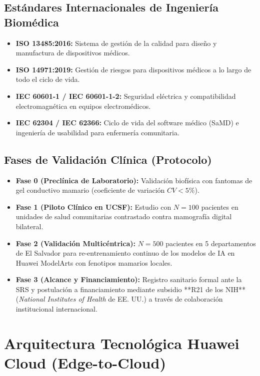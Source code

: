 \documentclass[11pt,a4paper]{article}
\begin{document}
\subsection{Estándares Internacionales de Ingeniería Biomédica}
\begin{itemize}
    \item \textbf{ISO 13485:2016:} Sistema de gestión de la calidad para diseño y manufactura de dispositivos médicos.
    \item \textbf{ISO 14971:2019:} Gestión de riesgos para dispositivos médicos a lo largo de todo el ciclo de vida.
    \item \textbf{IEC 60601-1 / IEC 60601-1-2:} Seguridad eléctrica y compatibilidad electromagnética en equipos electromédicos.
    \item \textbf{IEC 62304 / IEC 62366:} Ciclo de vida del software médico (SaMD) e ingeniería de usabilidad para enfermería comunitaria.
\end{itemize}

\subsection{Fases de Validación Clínica (Protocolo)}
\begin{itemize}
    \item \textbf{Fase 0 (Preclínica de Laboratorio):} Validación biofísica con fantomas de gel conductivo mamario (coeficiente de variación $CV < 5\%$).
    \item \textbf{Fase 1 (Piloto Clínico en UCSF):} Estudio con $N=100$ pacientes en unidades de salud comunitarias contrastado contra mamografía digital bilateral.
    \item \textbf{Fase 2 (Validación Multicéntrica):} $N=500$ pacientes en 5 departamentos de El Salvador para re-entrenamiento continuo de los modelos de IA en Huawei ModelArts con fenotipos mamarios locales.
    \item \textbf{Fase 3 (Alcance y Financiamiento):} Registro sanitario formal ante la SRS y postulación a financiamiento mediante subsidio **R21 de los NIH** (\textit{National Institutes of Health} de EE. UU.) a través de colaboración institucional internacional.
\end{itemize}

\section{Arquitectura Tecnológica Huawei Cloud (Edge-to-Cloud)}
\end{document}
